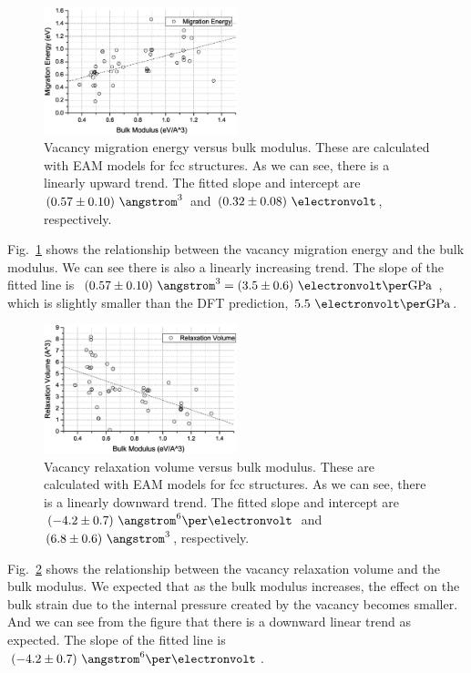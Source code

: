 \documentclass[%
 reprint,
 amsmath,amssymb,
 aps,
]{revtex4-1}
\begin{document}
\begin{figure}
\centering
\includegraphics[width=0.5\textwidth, clip, trim = 10mm 3mm 10mm 10mm]{vme_vs_bulk}%
\caption{\label{fig:vmevsbulk}
Vacancy migration energy versus bulk modulus.
These are calculated with EAM models for fcc structures.
As we can see, there is a linearly upward trend.
The fitted slope and intercept are $(0.57\pm0.10)~\angstrom^3$ and $(0.32\pm0.08)~\electronvolt$, respectively.
}
\end{figure}

Fig.~\ref{fig:vmevsbulk} shows the relationship between the vacancy migration energy and the bulk modulus.
We can see there is also a linearly increasing trend.
The slope of the fitted line is $(0.57\pm0.10)~\angstrom^3 = (3.5\pm0.6)~\electronvolt\per\mathrm{GPa}$, which is slightly smaller than the DFT prediction, $5.5~\electronvolt\per\mathrm{GPa}$.

\begin{figure}
\centering
\includegraphics[width=0.5\textwidth, clip, trim = 10mm 3mm 10mm 10mm]{vrv_vs_bulk}%
\caption{\label{fig:vrvvsbulk}
Vacancy relaxation volume versus bulk modulus.
These are calculated with EAM models for fcc structures.
As we can see, there is a linearly downward trend.
The fitted slope and intercept are $(-4.2\pm0.7)~\angstrom^6\per\electronvolt$ and $(6.8\pm0.6)~\angstrom^3$, respectively.
}
\end{figure}

Fig.~\ref{fig:vrvvsbulk} shows the relationship between the vacancy relaxation volume and the bulk modulus.
We expected that as the bulk modulus increases, the effect on the bulk strain due to the internal pressure created by the vacancy becomes smaller.
And we can see from the figure that there is a downward linear trend as expected.
The slope of the fitted line is $(-4.2\pm0.7)~\angstrom^6\per\electronvolt$.
\end{document}
